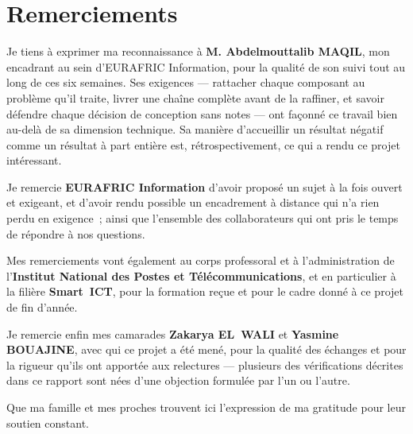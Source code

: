 %

\chapter*{Remerciements}

Je tiens à exprimer ma reconnaissance à \textbf{M. Abdelmouttalib MAQIL}, mon
encadrant au sein d'EURAFRIC Information, pour la qualité de son suivi tout au
long de ces six semaines. Ses exigences — rattacher chaque composant au problème
qu'il traite, livrer une chaîne complète avant de la raffiner, et savoir défendre
chaque décision de conception sans notes — ont façonné ce travail bien au-delà de
sa dimension technique. Sa manière d'accueillir un résultat négatif comme un
résultat à part entière est, rétrospectivement, ce qui a rendu ce projet
intéressant.

Je remercie \textbf{EURAFRIC Information} d'avoir proposé un sujet à la fois
ouvert et exigeant, et d'avoir rendu possible un encadrement à distance qui n'a
rien perdu en exigence~; ainsi que l'ensemble des collaborateurs qui ont pris le
temps de répondre à nos questions.

Mes remerciements vont également au corps professoral et à l'administration de
l'\textbf{Institut National des Postes et Télécommunications}, et en particulier
à la filière \textbf{Smart~ICT}, pour la formation reçue et pour le cadre donné à
ce projet de fin d'année.

Je remercie enfin mes camarades \textbf{Zakarya EL~WALI} et \textbf{Yasmine
BOUAJINE}, avec qui ce projet a été mené, pour la qualité des échanges et pour la
rigueur qu'ils ont apportée aux relectures — plusieurs des vérifications décrites
dans ce rapport sont nées d'une objection formulée par l'un ou l'autre.

Que ma famille et mes proches trouvent ici l'expression de ma gratitude pour leur
soutien constant.
